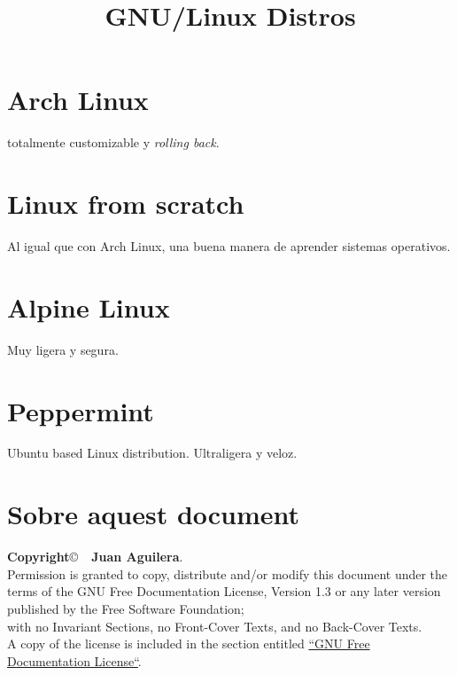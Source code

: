 \documentclass[a4paper]{article}
\begin{document}
\title{GNU/Linux Distros}
\maketitle

\tableofcontents


%

\begin{comment}
oddsidemargin \the\oddsidemargin \newline
textwidth \the\textwidth \newline
marginparsep \the\marginparsep \newline
marginparwidth \the\marginparwidth \newline
hoffset \the\hoffset \newline
paperwidth \the\paperwidth 
\end{comment}

\section{Arch Linux}
totalmente customizable y \textit{rolling back}.

\section{Linux from scratch}Al igual que con Arch Linux, una buena manera de aprender sistemas operativos.

\section{Alpine Linux}Muy ligera y segura.
\section{Peppermint}Ubuntu based Linux distribution. Ultraligera y veloz.
\section{Sobre aquest document}
\textbf{Copyright}\copyright\ \textbf{\the\year\ Juan Aguilera}.\\
Permission is granted to copy, distribute and/or modify this document under the terms of the GNU Free Documentation License, Version 1.3 or any later version published by the Free Software Foundation;\\
with no Invariant Sections, no Front-Cover Texts, and no Back-Cover Texts.\\
A copy of the license is included in the section entitled \href{http://www.gnu.org/licenses/fdl.html}{``GNU Free Documentation License``}.
\end{document}
